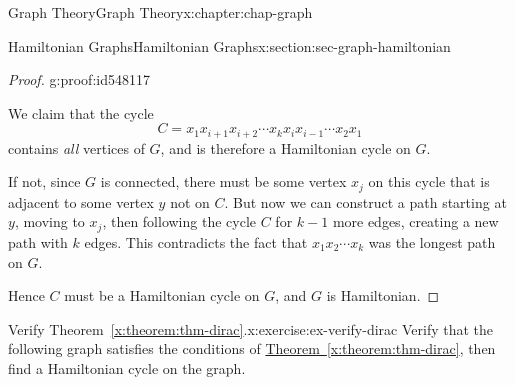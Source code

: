 \documentclass[oneside,10pt,]{book}
\newcommand{\xreffont}{\relax}
\numberwithin{equation}{section}
\begin{document}
\begin{chapterptx}{Graph Theory}{}{Graph Theory}{}{}{x:chapter:chap-graph}
\begin{sectionptx}{Hamiltonian Graphs}{}{Hamiltonian Graphs}{}{}{x:section:sec-graph-hamiltonian}
\begin{proof}{}{g:proof:id548117}
\begin{sidebyside}{1}{0.2}{0.2}{0}
\begin{sbspanel}{0.6}
{
}%
\end{sbspanel}%
\end{sidebyside}%
\par
We claim that the cycle%
\begin{equation*}
C = x_1x_{i+1}x_{i+2} \cdots x_kx_ix_{i-1}\cdots x_2x_1
\end{equation*}
contains \emph{all} vertices of \(G\), and is therefore a Hamiltonian cycle on \(G\).%
\par
If not, since \(G\) is connected, there must be some vertex \(x_j\) on this cycle that is adjacent to some vertex \(y\) not on \(C\). But now we can construct a path starting at \(y\), moving to \(x_j\), then following the cycle \(C\) for \(k-1\) more edges, creating a new path with \(k\) edges. This contradicts the fact that \(x_1x_2\cdots x_k\) was the longest path on \(G\).%
\par
Hence \(C\) must be a Hamiltonian cycle on \(G\), and \(G\) is Hamiltonian.%
\end{proof}
\begin{inlineexercise}{Verify Theorem~{\xreffont\ref*{x:theorem:thm-dirac}}.}{x:exercise:ex-verify-dirac}%
Verify that the following graph satisfies the conditions of \hyperref[x:theorem:thm-dirac]{Theorem~{\xreffont\ref{x:theorem:thm-dirac}}}, then find a Hamiltonian cycle on the graph.%
\begin{sidebyside}{1}{0.325}{0.325}{0}%
\begin{sbspanel}{0.35}%
\end{sbspanel}
\end{sidebyside}
\end{inlineexercise}
\end{sectionptx}
\end{chapterptx}
\end{document}
